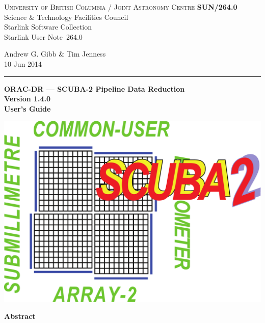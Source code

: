 \documentclass[twoside,11pt]{article}
\newcommand{\stardoccategory}  {Starlink User Note}
\newcommand{\stardocinitials}  {SUN}
\newcommand{\stardocnumber}    {264.0}
\newcommand{\stardocauthors}   {Andrew G. Gibb \& Tim Jenness}
\newcommand{\stardocdate}      {10 Jun 2014}
\newcommand{\stardoctitle}     {ORAC-DR --- SCUBA-2 Pipeline Data Reduction}
\newcommand{\stardocversion}   {Version 1.4.0}
\newcommand{\stardocmanual}    {User's Guide}
\newcommand{\stardocname}{\stardocinitials /\stardocnumber}
\newenvironment{latexonly}{}{}
\renewcommand{\_}{\texttt{\symbol{95}}}
\begin{document}
\thispagestyle{empty}

\begin{latexonly}
   \textsc{University of British Columbia} / \textsc{Joint Astronomy Centre} \hfill \textbf{\stardocname}\\
   {\large Science \& Technology Facilities Council}\\
   {\large Starlink Software Collection\\}
   {\large \stardoccategory\ \stardocnumber}
   \begin{flushright}
   \stardocauthors\\
   \stardocdate
   \end{flushright}
   \vspace{-4mm}
   \rule{\textwidth}{0.5mm}
   \vspace{5mm}
   \begin{center}
   {\Huge\textbf{\stardoctitle \\ [2.5ex]}}
   {\LARGE\textbf{\stardocversion \\ [4ex]}}
   {\Huge\textbf{\stardocmanual}}
   \end{center}
   \vspace{5mm}

\begin{center}
\includegraphics[scale=0.3]{sun264_logo}
\end{center}

   \vspace{10mm}
   \begin{center}
      {\Large\textbf{Abstract}}
   \end{center}
\end{latexonly}
\end{document}
